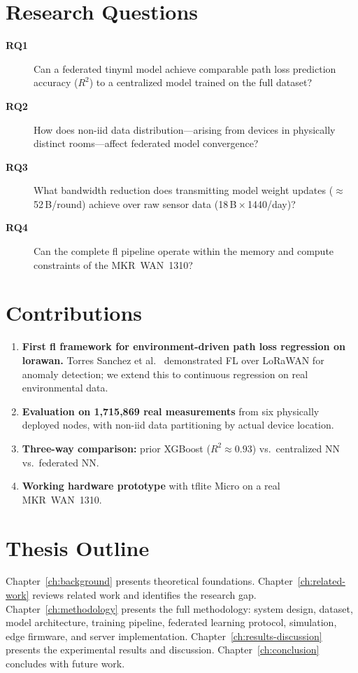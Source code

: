 \documentclass[12pt, a4paper, twoside, openright]{report}
\begin{document}
\section{Research Questions}
\label{sec:research-questions}
\begin{description}
  \item[\textbf{RQ1}] Can a federated \gls{tinyml} model achieve comparable path loss prediction accuracy ($R^2$) to a centralized model trained on the full dataset?
  \item[\textbf{RQ2}] How does non-\gls{iid} data distribution---arising from devices in physically distinct rooms---affect federated model convergence?
  \item[\textbf{RQ3}] What bandwidth reduction does transmitting model weight updates ($\approx$\,52\,B/round) achieve over raw sensor data (18\,B\,$\times$\,1440/day)?
  \item[\textbf{RQ4}] Can the complete \gls{fl} pipeline operate within the memory and compute constraints of the MKR~WAN~1310?
\end{description}

\section{Contributions}
\label{sec:contributions}
\begin{enumerate}
  \item \textbf{First \gls{fl} framework for environment-driven path loss regression on \gls{lorawan}.} Torres Sanchez et al.~\cite{torressanchez2024federated} demonstrated FL over LoRaWAN for anomaly detection; we extend this to continuous regression on real environmental data.
  \item \textbf{Evaluation on 1,715,869 real measurements} from six physically deployed nodes, with non-\gls{iid} data partitioning by actual device location.
  \item \textbf{Three-way comparison:} prior XGBoost ($R^2 \approx 0.93$) vs.\ centralized NN vs.\ federated NN.
  \item \textbf{Working hardware prototype} with \gls{tflite} Micro on a real MKR~WAN~1310.
\end{enumerate}

\section{Thesis Outline}
\label{sec:outline}
Chapter~\ref{ch:background} presents theoretical foundations. Chapter~\ref{ch:related-work} reviews related work and identifies the research gap. Chapter~\ref{ch:methodology} presents the full methodology: system design, dataset, model architecture, training pipeline, federated learning protocol, simulation, edge firmware, and server implementation. Chapter~\ref{ch:results-discussion} presents the experimental results and discussion. Chapter~\ref{ch:conclusion} concludes with future work.
\end{document}
